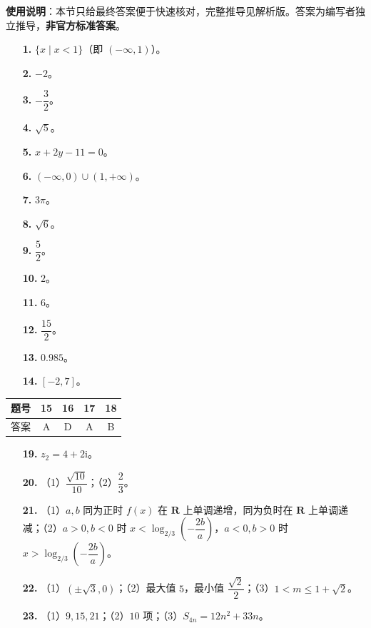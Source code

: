 
\begin{gknotice}
\textbf{使用说明}：本节只给最终答案便于快速核对，完整推导见解析版。答案为编写者独立推导，\textbf{非官方标准答案}。
\end{gknotice}

\begin{itemize}[leftmargin=2.6em]
  \item[\textbf{1.}] $\{x\mid x<1\}$（即 $(-\infty,1)$）。
  \item[\textbf{2.}] $-2$。
  \item[\textbf{3.}] $-\dfrac32$。
  \item[\textbf{4.}] $\sqrt5$。
  \item[\textbf{5.}] $x+2y-11=0$。
  \item[\textbf{6.}] $(-\infty,0)\cup(1,+\infty)$。
  \item[\textbf{7.}] $3\pi$。
  \item[\textbf{8.}] $\sqrt6$。
  \item[\textbf{9.}] $\dfrac52$。
  \item[\textbf{10.}] $2$。
  \item[\textbf{11.}] $6$。
  \item[\textbf{12.}] $\dfrac{15}{2}$。
  \item[\textbf{13.}] $0.985$。
  \item[\textbf{14.}] $[-2,7]$。
\end{itemize}

\begin{center}\begin{tabular}{ccccc}
\toprule
题号 & 15 & 16 & 17 & 18 \\
\midrule
答案 & A & D & A & B \\
\bottomrule
\end{tabular}\end{center}

\begin{itemize}[leftmargin=2.6em]
  \item[\textbf{19.}] $z_2=4+2\mathrm i$。
  \item[\textbf{20.}] （1）$\dfrac{\sqrt{10}}{10}$；（2）$\dfrac23$。
  \item[\textbf{21.}] （1）$a,b$ 同为正时 $f(x)$ 在 $\mathbf R$ 上单调递增，同为负时在 $\mathbf R$ 上单调递减；（2）$a>0,b<0$ 时 $x<\log_{2/3}\left(-\dfrac{2b}{a}\right)$，$a<0,b>0$ 时 $x>\log_{2/3}\left(-\dfrac{2b}{a}\right)$。
  \item[\textbf{22.}] （1）$(\pm\sqrt3,0)$；（2）最大值 $5$，最小值 $\dfrac{\sqrt2}{2}$；（3）$1<m\leqslant1+\sqrt2$。
  \item[\textbf{23.}] （1）$9,15,21$；（2）$10$ 项；（3）$S_{4n}=12n^2+33n$。
\end{itemize}

